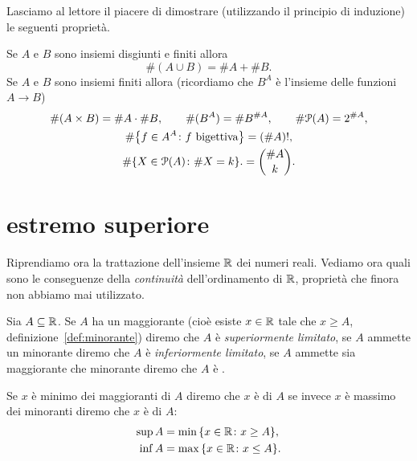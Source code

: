 Lasciamo al lettore il piacere di dimostrare (utilizzando il principio di induzione)
le seguenti proprietà.
\begin{theorem}
  \label{th:combinatoria}
  Se $A$ e $B$ sono insiemi disgiunti e finiti allora  
  \[
    \#(A\cup B) = \#A + \#B.
  \]
  Se $A$ e $B$ sono insiemi finiti allora 
  (ricordiamo che $B^A$ è l'insieme delle funzioni $A\to B$)
  \begin{gather*}
    \#(A \times B) = \#A\cdot \#B, \qquad
    \#(B^A) = \#B^{\#A}, \qquad
    \#\mathcal P(A) = 2^{\# A}, \\
    \#{\left\{ f\in A^A\colon \text{$f$ bigettiva} \right\}} = (\#A)!, \\
     \#{\left\{ X\in \mathcal P(A)\colon \#X = k \right\}}.  
     = {\#A \choose k}. 
  \end{gather*}
\end{theorem}
  
\section{estremo superiore}

Riprendiamo ora la trattazione dell'insieme ${\mathbb R}$ dei numeri reali.
Vediamo ora quali sono le conseguenze della \emph{continuità}
dell'ordinamento di ${\mathbb R}$, proprietà che finora non abbiamo mai 
utilizzato.

\begin{definition}%
  \mymark{***}%
  Sia $A \subseteq {\mathbb R}$.
  Se $A$ ha un maggiorante (cioè esiste $x\in {\mathbb R}$ tale che $x\ge A$, definizione~\ref{def:minorante})
  diremo che $A$ è \emph{superiormente limitato},
  se $A$ ammette un minorante diremo che $A$ è \emph{inferiormente limitato},
  se $A$ ammette sia maggiorante che minorante diremo che $A$ è 
  .
  
  Se $x$ è minimo dei maggioranti di $A$ diremo che $x$ è
  di $A$ se invece $x$ è massimo dei minoranti diremo che $x$ è
   di $A$:
  \begin{align*}
  \sup A &= \min {\left\{ x\in {\mathbb R}\colon x\ge A \right\}}, \\
  \inf A &= \max {\left\{ x\in {\mathbb R}\colon x \le A \right\}}.
  \end{align*}
  \index{$\sup$}%
  \index{$\inf$}%
\end{definition}

